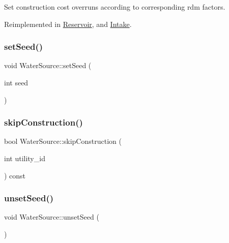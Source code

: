 Set construction cost overruns according to corresponding rdm factors. 

Reimplemented in \mbox{\hyperlink{classReservoir_ad1bb7aa46397719d09e0b6188b9bc28d}{Reservoir}}, and \mbox{\hyperlink{classIntake_a879c4c780a4d21606e848f57464cf3b6}{Intake}}.

\mbox{\label{classWaterSource_a741c60afc9dafaae318ce7c99f4fd327}} 
\subsubsection{\texorpdfstring{set\+Seed()}{setSeed()}}
{\footnotesize\ttfamily void Water\+Source\+::set\+Seed (\begin{DoxyParamCaption}\item[{int}]{seed }\end{DoxyParamCaption})\hspace{0.3cm}{\ttfamily [static]}}

\mbox{\label{classWaterSource_ac3105a8ef5470af2e40e7ed74a9be157}} 
\subsubsection{\texorpdfstring{skip\+Construction()}{skipConstruction()}}
{\footnotesize\ttfamily bool Water\+Source\+::skip\+Construction (\begin{DoxyParamCaption}\item[{int}]{utility\+\_\+id }\end{DoxyParamCaption}) const\hspace{0.3cm}{\ttfamily [virtual]}}

\mbox{\label{classWaterSource_a4bd60dafcc0b18f1c7a415f489bb220a}} 
\subsubsection{\texorpdfstring{unset\+Seed()}{unsetSeed()}}
{\footnotesize\ttfamily void Water\+Source\+::unset\+Seed (\begin{DoxyParamCaption}{ }\end{DoxyParamCaption})\hspace{0.3cm}{\ttfamily [static]}}



